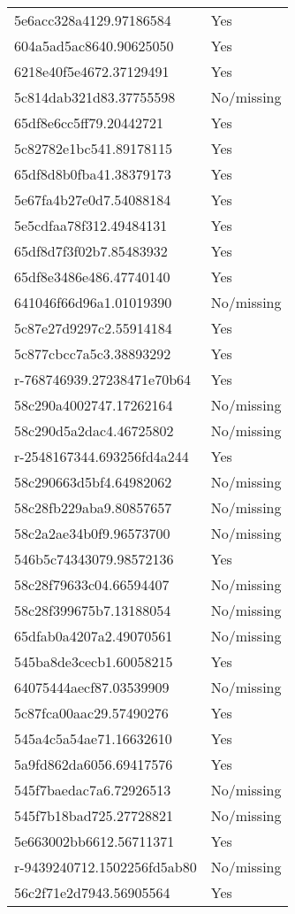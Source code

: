 \begin{tabular}{ll}
5e6acc328a4129.97186584 & Yes \\
604a5ad5ac8640.90625050 & Yes \\
6218e40f5e4672.37129491 & Yes \\
5c814dab321d83.37755598 & No/missing \\
65df8e6cc5ff79.20442721 & Yes \\
5c82782e1bc541.89178115 & Yes \\
65df8d8b0fba41.38379173 & Yes \\
5e67fa4b27e0d7.54088184 & Yes \\
5e5cdfaa78f312.49484131 & Yes \\
65df8d7f3f02b7.85483932 & Yes \\
65df8e3486e486.47740140 & Yes \\
641046f66d96a1.01019390 & No/missing \\
5c87e27d9297c2.55914184 & Yes \\
5c877cbcc7a5c3.38893292 & Yes \\
r-768746939.27238471e70b64 & Yes \\
58c290a4002747.17262164 & No/missing \\
58c290d5a2dac4.46725802 & No/missing \\
r-2548167344.693256fd4a244 & Yes \\
58c290663d5bf4.64982062 & No/missing \\
58c28fb229aba9.80857657 & No/missing \\
58c2a2ae34b0f9.96573700 & No/missing \\
546b5c74343079.98572136 & Yes \\
58c28f79633c04.66594407 & No/missing \\
58c28f399675b7.13188054 & No/missing \\
65dfab0a4207a2.49070561 & No/missing \\
545ba8de3cecb1.60058215 & Yes \\
64075444aecf87.03539909 & No/missing \\
5c87fca00aac29.57490276 & Yes \\
545a4c5a54ae71.16632610 & Yes \\
5a9fd862da6056.69417576 & Yes \\
545f7baedac7a6.72926513 & No/missing \\
545f7b18bad725.27728821 & No/missing \\
5e663002bb6612.56711371 & Yes \\
r-9439240712.1502256fd5ab80 & No/missing \\
56c2f71e2d7943.56905564 & Yes \\

\end{tabular}
